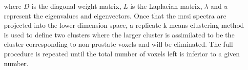 \begin{enumerate}[leftmargin=*]
\noindent where $D$ is the diagonal weight matrix, $L$ is the Laplacian matrix, $\lambda$ and $u$ represent the eigenvalues and eigenvectors.
Once that the \ac{mrsi} spectra are projected into the lower dimension space, a replicate k-means clustering method is used to define two clusters where the larger cluster is assimilated to be the cluster corresponding to non-prostate voxels and will be eliminated.
The full procedure is repeated until the total number of voxels left is inferior to a given number.


\end{enumerate}









